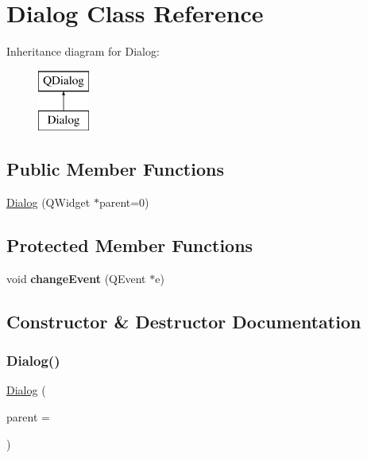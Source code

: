 \hypertarget{class_dialog}{}\section{Dialog Class Reference}
\label{class_dialog}
Inheritance diagram for Dialog\+:\begin{figure}[H]
\begin{center}
\leavevmode
\includegraphics[height=2.000000cm]{class_dialog}
\end{center}
\end{figure}
\subsection*{Public Member Functions}
\begin{DoxyCompactItemize}
\item 
\mbox{\hyperlink{class_dialog_a451791e28ab30149c4ff7fefd709da57}{Dialog}} (Q\+Widget $\ast$parent=0)
\end{DoxyCompactItemize}
\subsection*{Protected Member Functions}
\begin{DoxyCompactItemize}
\item 
\mbox{\label{class_dialog_a35d3587c7aec05ebd82542643f2f67f9}} 
void {\bfseries change\+Event} (Q\+Event $\ast$e)
\end{DoxyCompactItemize}


\subsection{Constructor \& Destructor Documentation}
\mbox{\label{class_dialog_a451791e28ab30149c4ff7fefd709da57}} 
\subsubsection{\texorpdfstring{Dialog()}{Dialog()}}
{\footnotesize\ttfamily \mbox{\hyperlink{class_dialog}{Dialog}} (\begin{DoxyParamCaption}\item[{Q\+Widget $\ast$}]{parent = {} }\end{DoxyParamCaption})\hspace{0.3cm}{\ttfamily [explicit]}}

